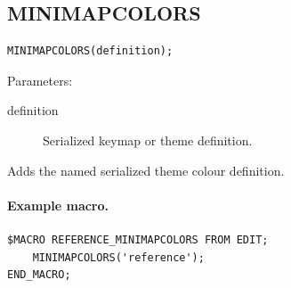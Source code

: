\documentclass[a4paper,10pt,twoside,openany]{book}
\newenvironment{mrmacextension}{\begin{changebar}}{\end{changebar}}
\begin{document}
\begin{mrmacextension}
\label{prim:procedure-minimapcolors}
\subsection*{MINIMAPCOLORS}
\begin{verbatim}
MINIMAPCOLORS(definition);
\end{verbatim}
Parameters:
\begin{description}
\item[definition] Serialized keymap or theme definition.
\end{description}

Adds the named serialized theme colour definition.

\paragraph{Example macro.}
\begin{verbatim}
$MACRO REFERENCE_MINIMAPCOLORS FROM EDIT;
    MINIMAPCOLORS('reference');
END_MACRO;
\end{verbatim}
\end{mrmacextension}
\end{document}
